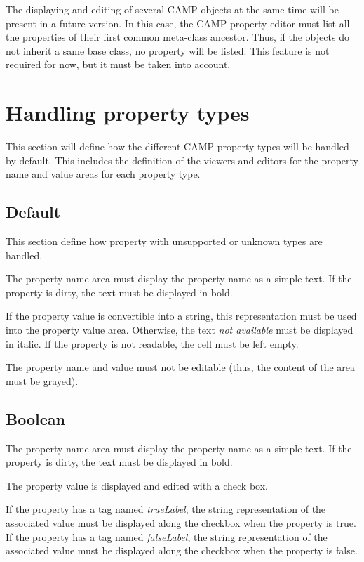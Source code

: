 \documentclass[a4paper, twoside]{report}
\begin{document}
The displaying and editing of several CAMP objects at the same time will be present in a future
version. In this case, the CAMP property editor must list all the properties of their first common
meta-class ancestor. Thus, if the objects do not inherit a same base class, no property will be
listed. This feature is not required for now, but it must be taken into account.

\chapter{Handling property types\label{sec:property_types}}

This section will define how the different CAMP property types will be handled by default. This
includes the definition of the viewers and editors for the property name and value areas for each
property type.

\section{Default}

This section define how property with unsupported or unknown types are handled.

The property name area must display the property name as a simple text. If the property is dirty, the
text must be displayed in bold.

If the property value is convertible into a string, this representation must be used into the
property value area. Otherwise, the text \emph{not available} must be displayed in italic. If the
property is not readable, the cell must be left empty.

The property name and value must not be editable (thus, the content of the area must be grayed).

\section{Boolean}

The property name area must display the property name as a simple text. If the property is dirty,
the text must be displayed in bold.

The property value is displayed and edited with a check box.

If the property has a tag named \emph{trueLabel}, the string representation of the associated value
must be displayed along the checkbox when the property is true.
If the property has a tag named \emph{falseLabel}, the string representation of the associated value
must be displayed along the checkbox when the property is false.
\end{document}
